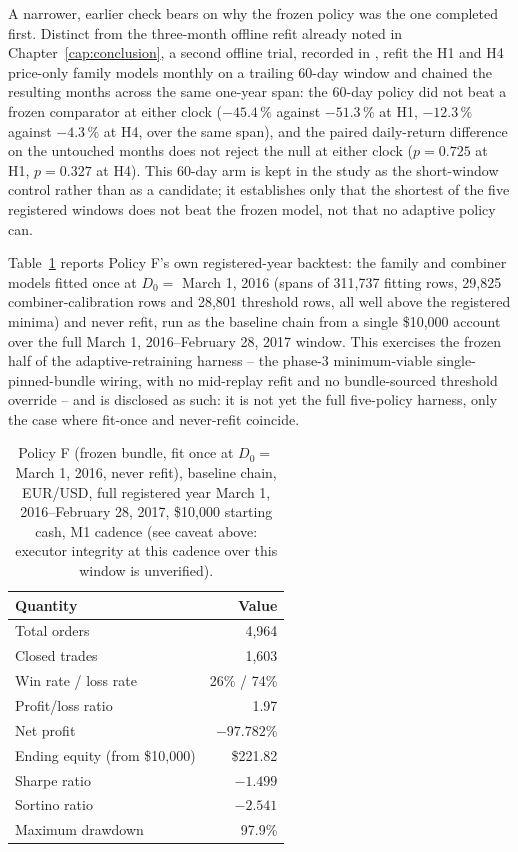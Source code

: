 A narrower, earlier check bears on why the frozen policy was the one completed first. Distinct from the three-month offline refit already noted in Chapter~\ref{cap:conclusion}, a second offline trial, recorded in , refit the H1 and H4 price-only family models monthly on a trailing 60-day window and chained the resulting months across the same one-year span: the 60-day policy did not beat a frozen comparator at either clock ($-45.4\,\%$ against $-51.3\,\%$ at H1, $-12.3\,\%$ against $-4.3\,\%$ at H4, over the same span), and the paired daily-return difference on the untouched months does not reject the null at either clock ($p=0.725$ at H1, $p=0.327$ at H4). This 60-day arm is kept in the study as the short-window control rather than as a candidate; it establishes only that the shortest of the five registered windows does not beat the frozen model, not that no adaptive policy can.

Table~\ref{tab:policy-f-year} reports Policy F's own registered-year backtest: the family and combiner models fitted once at $D_0=$ March 1, 2016 (spans of 311,737 fitting rows, 29,825 combiner-calibration rows and 28,801 threshold rows, all well above the registered minima) and never refit, run as the baseline chain from a single \$10,000 account over the full March 1, 2016--February 28, 2017 window. This exercises the frozen half of the adaptive-retraining harness -- the phase-3 minimum-viable single-pinned-bundle wiring, with no mid-replay refit and no bundle-sourced threshold override -- and is disclosed as such: it is not yet the full five-policy harness, only the case where fit-once and never-refit coincide.

\begin{table}[htbp]
\centering
\caption{Policy F (frozen bundle, fit once at $D_0=$ March 1, 2016, never refit), baseline chain, EUR/USD, full registered year March 1, 2016--February 28, 2017, \$10,000 starting cash, M1 cadence (see caveat above: executor integrity at this cadence over this window is unverified).}
\label{tab:policy-f-year}
\small
\begin{tabular}{lr}
\toprule
\textbf{Quantity} & \textbf{Value} \\
\midrule
Total orders & 4,964 \\
Closed trades & 1,603 \\
Win rate / loss rate & 26\% / 74\% \\
Profit/loss ratio & 1.97 \\
Net profit & $-97.782\%$ \\
Ending equity (from \$10,000) & \$221.82 \\
Sharpe ratio & $-1.499$ \\
Sortino ratio & $-2.541$ \\
Maximum drawdown & 97.9\% \\
\bottomrule
\end{tabular}
\end{table}

